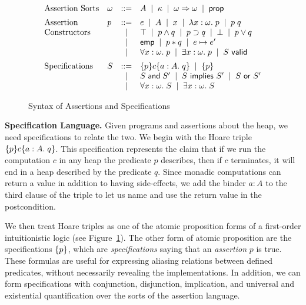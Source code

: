 \documentclass[preprint,natbib]{sigplanconf}
\begin{document}
\begin{figure}
{\small
\begin{displaymath}
\begin{array}{llcl}
\mbox{Assertion Sorts} & 
\omega & ::= & A \;\;|\;\; \kappa \;\;|\;\; \omega \Rightarrow \omega \;\;|\;\; \mbox{\textsf{{prop}}} 
\\[0.5em]
\mbox{Assertion} & 
p & ::= & e \;\;|\;\; A \;\;|\;\; x \;\;|\;\; \lambda x:\omega.\;p \;\;|\;\; p\;q \\
\mbox{Constructors}
& &  |  & \top \;\;|\;\; p \land q \;\;|\;\; p \supset q 
          \;\;|\;\; \bot \;\;|\;\; p \vee q \\
& &  |  &  \mathsf{emp} \;\;|\;\; p * q  \;\;|\;\; e \mapsto e' \\
& &  |  & \forall x:\omega.\; p \;\;|\;\; \exists x:\omega.\; p \;\;|\;\;
          {S}\mbox{\textsf{{ valid}}} 
\\[0.5em]
\mbox{Specifications} &
S & ::= & \{{p}\}{c}\{{a:A}.\;{q}\}  \;\;|\;\; \{{p}\} \\
& &  |  & S \;\mbox{\textsf{{and}}}\; S' \;\;|\;\; S \mbox{\textsf{{ implies }}} S' \;\;|\;\; S \mbox{\textsf{{ or }}} S' \\
& &  |  & \forall x:\omega.\; S \;\;|\;\; \exists x:\omega.\;S 
\\
\end{array}
\end{displaymath}
}
\caption{Syntax of Assertions and Specifications}
\label{assert-syntax}
\end{figure}

\textbf{Specification Language.} Given programs and assertions about
the heap, we need specifications to relate the two. We begin with the
Hoare triple $\{{p}\}{c}\{{a:A}.\;{q}\}$. This specification represents the
claim that if we run the computation $c$ in any heap the predicate $p$
describes, then if $c$ terminates, it will end in a heap described by
the predicate $q$. Since monadic computations can return a value in
addition to having side-effects, we add the binder $a:A$ to the third
clause of the triple to let us name and use the return value in the
postcondition. 

We then treat Hoare triples as one of the atomic proposition forms of
a first-order intuitionistic logic (see
Figure~\ref{assert-syntax}). The other form of atomic proposition are
the specifications $\{{p}\}$, which are \emph{specifications} saying that
an \emph{assertion} $p$ is true. These formulas are useful for
expressing aliasing relations between defined predicates, without
necessarily revealing the implementations. In addition, we can form
specifications with conjunction, disjunction, implication, and
universal and existential quantification over the sorts of the
assertion language. 
\end{document}
